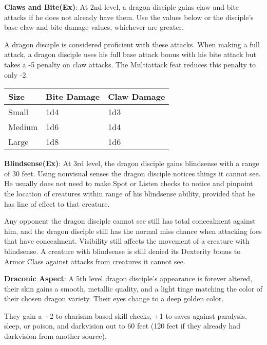 \textbf{Claws and Bite(Ex)}: At 2nd level, a dragon disciple gains claw and bite attacks if he does not already have them. Use the values below or the disciple’s base claw and bite damage values, whichever are greater.

A dragon disciple is considered proficient with these attacks. When making a full attack, a dragon disciple uses his full base attack bonus with his bite attack but takes a -5 penalty on claw attacks. The Multiattack feat reduces this penalty to only -2.

\begin{center}
\begin{adjustwidth}{-4cm}{}
\begin{small}
\begin{tabular}{| l | l | l |}
\hline
Size &Bite Damage &Claw Damage \\
\hline
Small &1d4 &1d3 \\
Medium &1d6 &1d4 \\
Large &1d8 &1d6 \\
\hline
\end{tabular}
\end{small}
\end{adjustwidth}
\end{center}

\textbf{Blindsense(Ex)}: At 3rd level, the dragon disciple gains blindsense with a range of 30 feet. Using nonvisual senses the dragon disciple notices things it cannot see. He usually does not need to make Spot or Listen checks to notice and pinpoint the location of creatures within range of his blindsense ability, provided that he has line of effect to that creature.

Any opponent the dragon disciple cannot see still has total concealment against him, and the dragon disciple still has the normal miss chance when attacking foes that have concealment. Visibility still affects the movement of a creature with blindsense. A creature with blindsense is still denied its Dexterity bonus to Armor Class against attacks from creatures it cannot see.

\textbf{Draconic Aspect}: A 5th level dragon disciple's appearance is forever altered, their skin gains a smooth, metallic quality, and a light tinge matching the color of their chosen dragon variety. Their eyes change to a deep golden color. 

They gain a +2 to charisma based skill checks, +1 to saves against paralysis, sleep, or poison, and darkvision out to 60 feet (120 feet if they already had darkvision from another source).